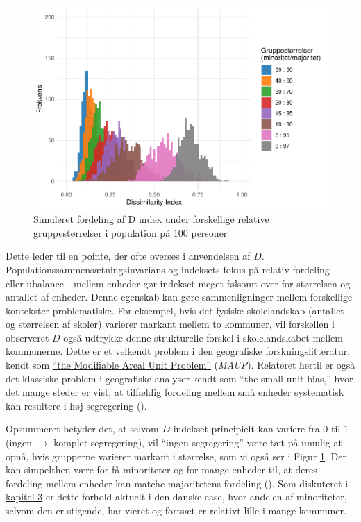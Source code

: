 \documentclass[
]{book}
\begin{document}
\begin{figure}
\includegraphics[width=1\linewidth]{en-befolkning-blander-sig_files/figure-latex/fig-9-1-1} \caption{Simuleret fordeling af D index under forskellige relative gruppestørrelser i population på 100 personer}\label{fig:fig-9-1}
\end{figure}

Dette leder til en pointe, der ofte overses i anvendelsen af \(D\). Populationssammensætningsinvarians og indeksets fokus på relativ fordeling---eller ubalance---mellem enheder gør indekset meget følsomt over for størrelsen og antallet af enheder. Denne egenskab kan gøre sammenligninger mellem forskellige kontekster problematiske. For eksempel, hvis det fysiske skolelandskab (antallet og størrelsen af skoler) varierer markant mellem to kommuner, vil forskellen i observeret \(D\) også udtrykke denne strukturelle forskel i skolelandskabet mellem kommunerne. Dette er et velkendt problem i den geografiske forskningslitteratur, kendt som \href{https://en.wikipedia.org/wiki/Modifiable_areal_unit_problem}{``the Modifiable Areal Unit Problem''} (\emph{MAUP}). Relateret hertil er også det klassiske problem i geografiske analyser kendt som ``the small-unit bias,'' hvor det mange steder er vist, at tilfældig fordeling mellem små enheder systematisk kan resultere i høj segregering ().

Opsummeret betyder det, at selvom \(D\)-indekset principielt kan variere fra \(0\) til \(1\) (ingen \(\rightarrow\) komplet segregering), vil ``ingen segregering'' være tæt på umulig at opnå, hvis grupperne varierer markant i størrelse, som vi også ser i Figur \ref{fig:fig-9-1}. Der kan simpelthen være for få minoriteter og for mange enheder til, at deres fordeling mellem enheder kan matche majoritetens fordeling (). Som diskuteret i \hyperref[kap3]{kapitel 3} er dette forhold aktuelt i den danske case, hvor andelen af minoriteter, selvom den er stigende, har været og fortsæt er relativt lille i mange kommuner.
\end{document}
